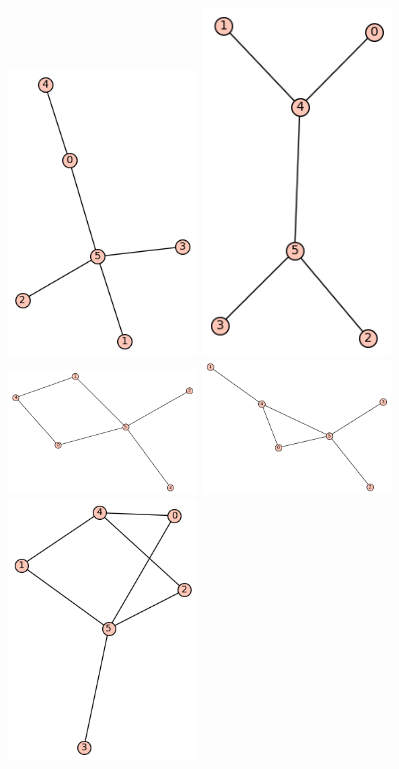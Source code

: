\documentclass[10pt, a4paper]{article}
\begin{document}
\includegraphics[width=5cm]{min_graf_6.1_vozlisca}
\includegraphics[width=5cm]{min_graf_6.2_vozlisca}
\includegraphics[width=5cm]{min_graf_6.3_vozlisca}
\includegraphics[width=5cm]{min_graf_6.4_vozlisca}
\includegraphics[width=5cm]{min_graf_6.5_vozlisca}
\end{document}
